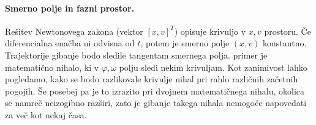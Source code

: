 \documentclass[a4paper]{article}
\begin{document}
\paragraph{Smerno polje in fazni prostor.} Rešitev Newtonovega zakona (vektor $[x, v]^T$) opisuje krivuljo v $x, v$ prostoru. Če diferencialna enačba ni odvisna od $t$, potem je smerno polje $(x, v)$ konstantno. Trajektorije gibanje bodo sledile tangentam smernega polja. primer je matematično nihalo, ki v $\varphi, \omega$ polju sledi nekim krivuljam.
Kot zanimivost lahko pogledamo, kako se bodo razlikovale krivulje nihal pri rahlo različnih začetnih pogojih. Še posebej pa je to izrazito pri dvojnem matematičnega nihalu, okolica se namreč neizogibno razširi, zato je gibanje takega nihala nemogoče napovedati za več kot nekaj časa.
\end{document}
